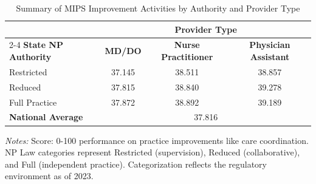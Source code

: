 \begin{table}[htbp]
    \centering
    \caption{Summary of MIPS Improvement Activities by Authority and Provider Type}
    \label{tab:mips_ia_score_provtype}
    \vspace{0.2cm}
    \begin{tabular}{lccc}
        \toprule
        & \multicolumn{3}{c}{\textbf{Provider Type}} \\
        \cmidrule(lr){2-4}
        \textbf{State NP Authority} & \textbf{MD/DO} & \textbf{Nurse Practitioner} & \textbf{Physician Assistant} \\
        \midrule
        Restricted & 37.145 & 38.511 & 38.857 \\
        Reduced & 37.815 & 38.840 & 39.278 \\
        Full Practice & 37.872 & 38.892 & 39.189 \\
        \midrule
        \textbf{National Average} & \multicolumn{3}{c}{37.816} \\
        \bottomrule
    \end{tabular}
    \vspace{0.1cm}
    \begin{minipage}{0.85\textwidth}
        \footnotesize \textit{Notes:} Score: 0-100 performance on practice improvements like care coordination. NP Law categories represent Restricted (supervision), Reduced (collaborative), and Full (independent practice). Categorization reflects the regulatory environment as of 2023.
    \end{minipage}
\end{table}